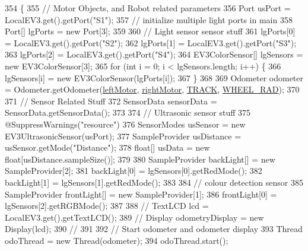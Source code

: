\begin{DoxyCode}
354                                                       \{
355     \textcolor{comment}{// Motor Objects, and Robot related parameters}
356     Port usPort = LocalEV3.get().getPort(\textcolor{stringliteral}{"S1"});
357     \textcolor{comment}{// initialize multiple light ports in main}
358     Port[] lgPorts = \textcolor{keyword}{new} Port[3];
359 
360     \textcolor{comment}{// Light sensor sensor stuff}
361     lgPorts[0] = LocalEV3.get().getPort(\textcolor{stringliteral}{"S2"});
362     lgPorts[1] = LocalEV3.get().getPort(\textcolor{stringliteral}{"S3"});
363     lgPorts[2] = LocalEV3.get().getPort(\textcolor{stringliteral}{"S4"});
364     EV3ColorSensor[] lgSensors = \textcolor{keyword}{new} EV3ColorSensor[3];
365     \textcolor{keywordflow}{for} (\textcolor{keywordtype}{int} i = 0; i < lgSensors.length; i++) \{
366       lgSensors[i] = \textcolor{keyword}{new} EV3ColorSensor(lgPorts[i]);
367     \}
368 
369     Odometer odometer = Odometer.getOdometer(\hyperlink{enumca_1_1mcgill_1_1ecse211_1_1project_1_1_game_a7c673571bf50fdb6917a9d7bb671e003}{leftMotor}, \hyperlink{enumca_1_1mcgill_1_1ecse211_1_1project_1_1_game_a7a05fcf37c4435c32270776a427ba0d2}{rightMotor}, 
      \hyperlink{enumca_1_1mcgill_1_1ecse211_1_1project_1_1_game_a64cf12cdd6772ac1ce351ff1dfadd626}{TRACK}, \hyperlink{enumca_1_1mcgill_1_1ecse211_1_1project_1_1_game_a91bd64670c2a91d006c907142783b1f8}{WHEEL\_RAD});
370 
371     \textcolor{comment}{// Sensor Related Stuff}
372     SensorData sensorData = SensorData.getSensorData();
373 
374     \textcolor{comment}{// Ultrasonic sensor stuff}
375     @SuppressWarnings(\textcolor{stringliteral}{"resource"})
376     SensorModes usSensor = new EV3UltrasonicSensor(usPort);
377     SampleProvider usDistance = usSensor.getMode("Distance");
378     \textcolor{keywordtype}{float}[] usData = new \textcolor{keywordtype}{float}[usDistance.sampleSize()];
379 
380     SampleProvider backLight[] = new SampleProvider[2];
381     backLight[0] = lgSensors[0].getRedMode();
382     backLight[1] = lgSensors[1].getRedMode();
383 
384     \textcolor{comment}{// colour detection sensor}
385     SampleProvider frontLight[] = new SampleProvider[1];
386     frontLight[0] = lgSensors[2].getRGBMode();
387 
388     \textcolor{comment}{// TextLCD lcd = LocalEV3.get().getTextLCD();}
389     \textcolor{comment}{// Display odometryDisplay = new Display(lcd);}
390     \textcolor{comment}{//}
391 
392     \textcolor{comment}{// Start odometer and odometer display}
393     Thread odoThread = new Thread(odometer);
394     odoThread.start();

\end{DoxyCode}
